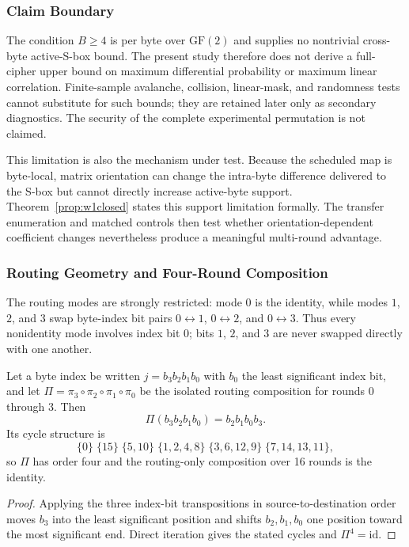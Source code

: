 \documentclass[cryptography,article,submit,oneauthor]{Definitions/mdpi}
\begin{document}
\subsubsection{Claim Boundary}\label{sec:3-6-limitations}
The condition $B\geq4$ is per byte over $\mathrm{GF}(2)$ and supplies no nontrivial cross-byte active-S-box bound. The present study therefore does not derive a full-cipher upper bound on maximum differential probability or maximum linear correlation. Finite-sample avalanche, collision, linear-mask, and randomness tests cannot substitute for such bounds; they are retained later only as secondary diagnostics. The security of the complete experimental permutation is not claimed.

This limitation is also the mechanism under test. Because the scheduled map is byte-local, matrix orientation can change the intra-byte difference delivered to the S-box but cannot directly increase active-byte support. Theorem~\ref{prop:w1closed} states this support limitation formally. The transfer enumeration and matched controls then test whether orientation-dependent coefficient changes nevertheless produce a meaningful multi-round advantage.\par
\subsubsection{Routing Geometry and Four-Round Composition}\label{sec:3-6-routing}
The routing modes are strongly restricted: mode $0$ is the identity, while modes $1$, $2$, and $3$ swap byte-index bit pairs $0\leftrightarrow1$, $0\leftrightarrow2$, and $0\leftrightarrow3$. Thus every nonidentity mode involves index bit $0$; bits $1$, $2$, and $3$ are never swapped directly with one another.

\begin{Proposition}\label{prop:routing-composition}
Let a byte index be written $j=b_3b_2b_1b_0$ with $b_0$ the least significant index bit, and let $\Pi=\pi_3\circ\pi_2\circ\pi_1\circ\pi_0$ be the isolated routing composition for rounds $0$ through $3$. Then
\[
\Pi(b_3b_2b_1b_0)=b_2b_1b_0b_3.
\]
Its cycle structure is
\[
\{0\}\;\{15\}\;\{5,10\}\;\{1,2,4,8\}\;\{3,6,12,9\}\;\{7,14,13,11\},
\]
so $\Pi$ has order four and the routing-only composition over 16 rounds is the identity.
\end{Proposition}
\begin{proof}
Applying the three index-bit transpositions in source-to-destination order moves $b_3$ into the least significant position and shifts $b_2,b_1,b_0$ one position toward the most significant end. Direct iteration gives the stated cycles and $\Pi^4=\mathrm{id}$.
\end{proof}
\end{document}
